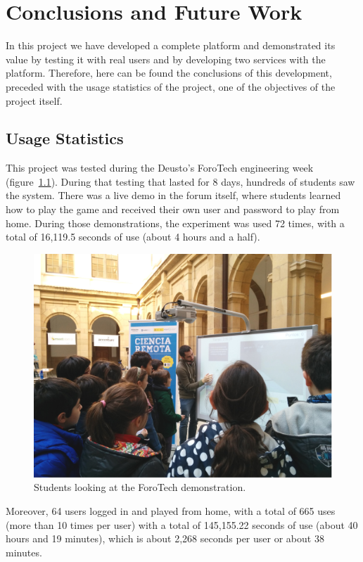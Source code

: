 \chapter{Conclusions and Future Work}

In this project we have developed a complete platform and demonstrated its value by testing it with
real users and by developing two services with the platform. Therefore, here can be found the
conclusions of this development, preceded with the usage statistics of the project, one of the
objectives of the project itself.

\section{Usage Statistics}

This project was tested during the Deusto's ForoTech engineering week (figure~\ref{fig:forotech}).
During that testing that lasted for 8 days, hundreds of students saw the system. There was a live
demo in the forum itself, where students learned how to play the game and received their own user
and password to play from home. During those demonstrations, the experiment was used 72 times, with
a total of 16,119.5 seconds of use (about 4 hours and a half).

\begin{figure}[ht]
	\centering
	\includegraphics[height=0.3\textheight]{fig/forotech}
	\caption{Students looking at the ForoTech demonstration.}
	\label{fig:forotech}
\end{figure}

Moreover, 64 users logged in and played from home, with a total of 665 uses (more than 10 times per
user) with a total of 145,155.22 seconds of use (about 40 hours and 19 minutes), which is about
2,268 seconds per user or about 38 minutes.

